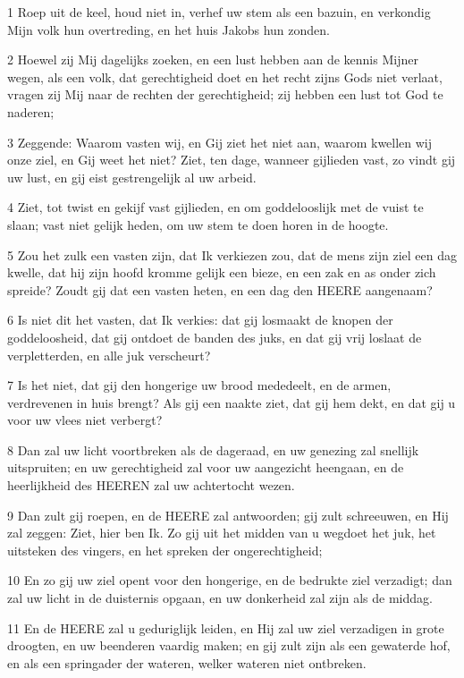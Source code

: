 \par 1 Roep uit de keel, houd niet in, verhef uw stem als een bazuin, en verkondig Mijn volk hun overtreding, en het huis Jakobs hun zonden.
\par 2 Hoewel zij Mij dagelijks zoeken, en een lust hebben aan de kennis Mijner wegen, als een volk, dat gerechtigheid doet en het recht zijns Gods niet verlaat, vragen zij Mij naar de rechten der gerechtigheid; zij hebben een lust tot God te naderen;
\par 3 Zeggende: Waarom vasten wij, en Gij ziet het niet aan, waarom kwellen wij onze ziel, en Gij weet het niet? Ziet, ten dage, wanneer gijlieden vast, zo vindt gij uw lust, en gij eist gestrengelijk al uw arbeid.
\par 4 Ziet, tot twist en gekijf vast gijlieden, en om goddelooslijk met de vuist te slaan; vast niet gelijk heden, om uw stem te doen horen in de hoogte.
\par 5 Zou het zulk een vasten zijn, dat Ik verkiezen zou, dat de mens zijn ziel een dag kwelle, dat hij zijn hoofd kromme gelijk een bieze, en een zak en as onder zich spreide? Zoudt gij dat een vasten heten, en een dag den HEERE aangenaam?
\par 6 Is niet dit het vasten, dat Ik verkies: dat gij losmaakt de knopen der goddeloosheid, dat gij ontdoet de banden des juks, en dat gij vrij loslaat de verpletterden, en alle juk verscheurt?
\par 7 Is het niet, dat gij den hongerige uw brood mededeelt, en de armen, verdrevenen in huis brengt? Als gij een naakte ziet, dat gij hem dekt, en dat gij u voor uw vlees niet verbergt?
\par 8 Dan zal uw licht voortbreken als de dageraad, en uw genezing zal snellijk uitspruiten; en uw gerechtigheid zal voor uw aangezicht heengaan, en de heerlijkheid des HEEREN zal uw achtertocht wezen.
\par 9 Dan zult gij roepen, en de HEERE zal antwoorden; gij zult schreeuwen, en Hij zal zeggen: Ziet, hier ben Ik. Zo gij uit het midden van u wegdoet het juk, het uitsteken des vingers, en het spreken der ongerechtigheid;
\par 10 En zo gij uw ziel opent voor den hongerige, en de bedrukte ziel verzadigt; dan zal uw licht in de duisternis opgaan, en uw donkerheid zal zijn als de middag.
\par 11 En de HEERE zal u geduriglijk leiden, en Hij zal uw ziel verzadigen in grote droogten, en uw beenderen vaardig maken; en gij zult zijn als een gewaterde hof, en als een springader der wateren, welker wateren niet ontbreken.
